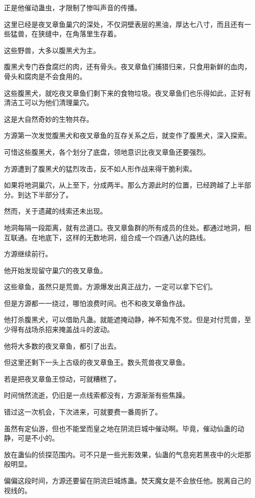 \begin{this_body}
正是他催动蛊虫，才限制了惨叫声音的传播。

这里已经是夜叉章鱼巢穴的深处，不仅洞壁表层的黑油，厚达七八寸，而且还有一些猛兽，在狭缝中，在角落里生存着。

这些野兽，大多以腹黑犬为主。

腹黑犬专门吞食腐烂的肉，还有骨头。夜叉章鱼们捕猎归来，只食用新鲜的血肉，骨头和腐肉是不会食用的。

这些腹黑犬，就吃夜叉章鱼们剩下来的食物垃圾。夜叉章鱼们也乐得如此，正好有清洁工可以为他们清理巢穴。

这是大自然奇妙的生物共存。

方源第一次发觉腹黑犬和夜叉章鱼的互存关系之后，就变作了腹黑犬，深入探索。

可惜这些腹黑犬，各个划分了底盘，领地意识比夜叉章鱼还要强烈。

方源遭到了腹黑犬的猛烈攻击，反不如人形作战来得干脆利索。

如果将地洞巢穴，从上至下，分成两半。那么方源此时的位置，已经跨越了上半部分。到达下半部分了。

然而，关于遗藏的线索还未出现。

地洞每隔一段距离，就有岔道口。夜叉章鱼群的所有成员的住处。都通过地洞，相互联通。在地底下，这样的无数地洞，组合成一个四通八达的路线。

方源继续前行。

他开始发现留守巢穴的夜叉章鱼。

这些章鱼，虽然只是荒兽。方源爆发出真正战力，一定可以拿下它们。

但是方源都一一绕过，哪怕浪费时间。也不和夜叉章鱼作战。

他打杀腹黑犬，可以借助凡蛊。就能遮掩动静，神不知鬼不觉。但是对付荒兽，至少得有战场杀招来掩盖战斗的波动。

他将大多数的夜叉章鱼，都引了出去。

但这里还剩下一头上古级的夜叉章鱼王。数头荒兽夜叉章鱼。

若是把夜叉章鱼王惊动，可就糟糕了。

时间悄然流逝，仍旧是一点线索都没有，方源渐渐有些焦躁。

错过这一次机会，下次进来，可就要费一番周折了。

虽然有定仙游，但也不能堂而皇之地在阴流巨城中催动啊。毕竟，催动仙蛊的动静，可是不小的。

放在蛊仙的侦探范围内。可不只是一些光影效果，仙蛊的气息宛若黑夜中的火炬那般明显。

偏偏这段时间，方源还要留在阴流巨城炼蛊。焚天魔女是不会放任他。脱离自己的视线的。


\end{this_body}
